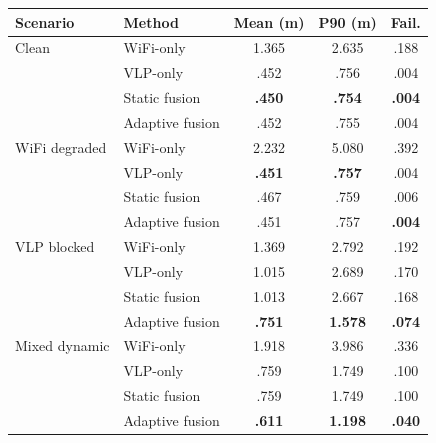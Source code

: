 \begin{tabular}{@{}llccc@{}}
\toprule
Scenario & Method & Mean (m) & P90 (m) & Fail. \\
\midrule
Clean & WiFi-only & 1.365 & 2.635 & .188 \\
 & VLP-only & .452 & .756 & .004 \\
 & Static fusion & \textbf{.450} & \textbf{.754} & \textbf{.004} \\
 & Adaptive fusion & .452 & .755 & .004 \\
\midrule
WiFi degraded & WiFi-only & 2.232 & 5.080 & .392 \\
 & VLP-only & \textbf{.451} & \textbf{.757} & .004 \\
 & Static fusion & .467 & .759 & .006 \\
 & Adaptive fusion & .451 & .757 & \textbf{.004} \\
\midrule
VLP blocked & WiFi-only & 1.369 & 2.792 & .192 \\
 & VLP-only & 1.015 & 2.689 & .170 \\
 & Static fusion & 1.013 & 2.667 & .168 \\
 & Adaptive fusion & \textbf{.751} & \textbf{1.578} & \textbf{.074} \\
\midrule
Mixed dynamic & WiFi-only & 1.918 & 3.986 & .336 \\
 & VLP-only & .759 & 1.749 & .100 \\
 & Static fusion & .759 & 1.749 & .100 \\
 & Adaptive fusion & \textbf{.611} & \textbf{1.198} & \textbf{.040} \\
\bottomrule
\end{tabular}
